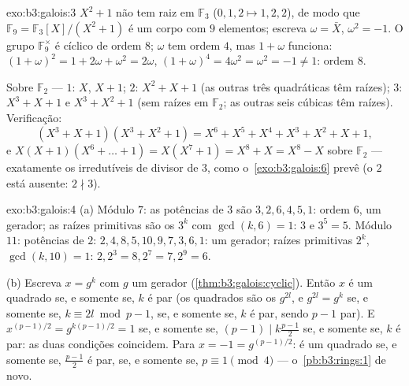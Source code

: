 \begin{solution}{exo:b3:galois:3}
$X^2 + 1$ não tem raiz em $\mathbb F_3$ ($0, 1, 2 \mapsto 1, 2,
2$), de modo que $\mathbb F_9 = \mathbb F_3[X]/(X^2+1)$ é um corpo com
$9$ elementos; escreva $\omega = \bar X$, $\omega^2 = -1$. O
grupo $\mathbb F_9^\times$ é cíclico de ordem $8$; $\omega$ tem
ordem $4$, mas $1 + \omega$ funciona: $(1+\omega)^2 = 1 + 2\omega +
\omega^2 = 2\omega$, $(1+\omega)^4 = 4\omega^2 = \omega^2 = -1
\ne 1$: ordem $8$.

Sobre $\mathbb F_2$ ---  $1$: $X$, $X + 1$;  $2$:
$X^2 + X + 1$ (as outras três quadráticas têm raízes); 
$3$: $X^3 + X + 1$ e $X^3 + X^2 + 1$ (sem raízes em $\mathbb
F_2$; as outras seis cúbicas têm raízes). Verificação:
\[
(X^3{+}X{+}1)(X^3{+}X^2{+}1) = X^6 + X^5 + X^4 + X^3 + X^2 + X
+ 1,
\]
e $X(X{+}1)(X^6 + \dots + 1) = X(X^7 + 1) = X^8 + X = X^8 -
X$ sobre $\mathbb F_2$ --- exatamente os irredutíveis de 
divisor de $3$, como o~\cref{exo:b3:galois:6} prevê (o  $2$ está
ausente: $2 \nmid 3$).
\end{solution}

\begin{solution}{exo:b3:galois:4}
(a) Módulo $7$: as potências de $3$ são $3, 2, 6, 4, 5, 1$: ordem
$6$, um gerador; as raízes primitivas são os $3^k$ com
$\gcd(k, 6) = 1$: $3$ e $3^5 = 5$. Módulo $11$: potências de $2$:
$2, 4, 8, 5, 10, 9, 7, 3, 6, 1$: um gerador; raízes primitivas
$2^k$, $\gcd(k, 10) = 1$: $2, 2^3 = 8, 2^7 = 7, 2^9 = 6$.

(b) Escreva $x = g^k$ com $g$ um gerador
(\cref{thm:b3:galois:cyclic}). Então $x$ é um quadrado se, e somente se, $k$ é
par (os quadrados são os $g^{2l}$, e $g^{2l} = g^{k}$ se, e somente se, $k
\equiv 2l \bmod p-1$,  se, e somente se, $k$ é par, sendo $p - 1$
par). E $x^{(p-1)/2} = g^{k(p-1)/2} = 1$ se, e somente se, $(p-1) \mid
k\frac{p-1}2$ se, e somente se, $k$ é par: as duas condições coincidem. Para $x =
-1 = g^{(p-1)/2}$: é um quadrado se, e somente se, $\frac{p-1}2$ é par, se, e somente se,
$p \equiv 1 \pmod 4$ --- o~\cref{pb:b3:rings:1} de novo.
\end{solution}

